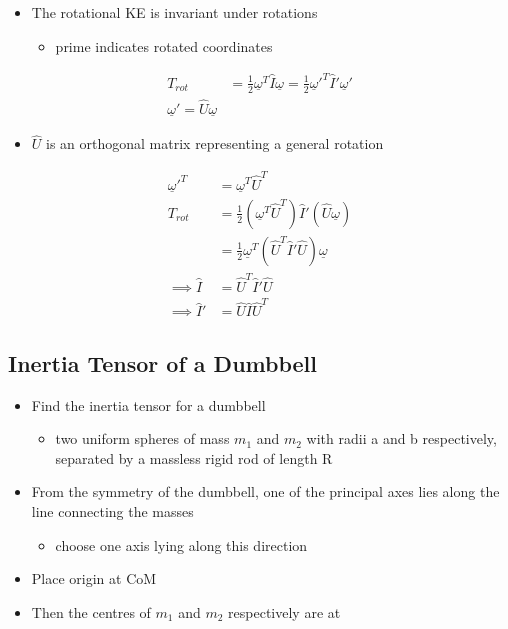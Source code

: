 \documentclass[a4paper,11pt,normalem]{article}
\begin{document}
\begin{itemize}
\item
  The rotational KE is invariant under rotations
  \begin{itemize}
  \item
    prime indicates rotated coordinates
  \end{itemize}
\end{itemize}

\[
    \begin{aligned}
    T_{rot} &= \frac{1}{2}\underline{\omega}^T \hat{I}\underline{\omega} = \frac{1}{2}\underline{\omega}'^T \hat{I}' \underline{\omega}' \\
    \underline{\omega}' = \hat{U} \underline{\omega}
    \end{aligned}
\]

\begin{itemize}
\item
  \(\hat{U}\) is an orthogonal matrix representing a general rotation
\end{itemize}

\[
    \begin{aligned}
    \underline{\omega}'^T &= \underline{\omega}^T \hat{U}^T \\
    T_{rot} &= \frac{1}{2} (\underline{\omega}^T \hat{U}^T) \hat{I}' (\hat{U} \underline{\omega}) \\
    &= \frac{1}{2}\underline{\omega}^T (\hat{U}^T \hat{I}' \hat{U}) \underline{\omega} \\
    \implies \hat{I} &= \hat{U}^T \hat{I}' \hat{U} \\
    \implies \hat{I}' &= \hat{U}\hat{I}\hat{U}^T
    \end{aligned}
\]

\subsection{Inertia Tensor of a Dumbbell}\label{inertia-tensor-of-a-dumbbell}

\begin{itemize}
\item
  Find the inertia tensor for a dumbbell
  \begin{itemize}
  \item
    two uniform spheres of mass \(m_1\) and \(m_2\) with radii a and b
    respectively, separated by a massless rigid rod of length R
  \end{itemize}
\item
  From the symmetry of the dumbbell, one of the principal axes lies
  along the line connecting the masses
  \begin{itemize}
  \item
    choose one axis lying along this direction
  \end{itemize}
\item
  Place origin at CoM
\item
  Then the centres of \(m_1\) and \(m_2\) respectively are at
\end{itemize}
\end{document}
